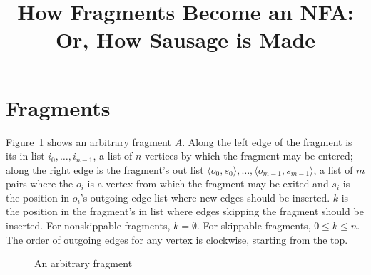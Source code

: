 \documentclass{article}
\begin{document}
\title{How Fragments Become an NFA:\\ Or, How Sausage is Made}
\maketitle

\section{Fragments}

Figure~\ref{fig:arbitrary} shows an arbitrary fragment $A$. Along the left edge of the fragment is its in list $i_0,\dots,i_{n-1}$, a list of $n$ vertices by which the fragment may be entered; along the right edge is the fragment's out list $\langle o_0,s_0\rangle,\dots,\langle o_{m-1},s_{m-1}\rangle$, a list of $m$ pairs where the $o_i$ is a vertex from which the fragment may be exited and $s_i$ is the position in $o_i$'s outgoing edge list where new edges should be inserted. $k$ is the position in the fragment's in list where edges skipping the fragment should be inserted. For nonskippable fragments, $k = \emptyset$. For skippable fragments, $0 \le k \le n$. The order of outgoing edges for any vertex is clockwise, starting from the top.

\begin{figure}[h]
\centering
{}
\caption{An arbitrary fragment\label{fig:arbitrary}}
\end{figure}
\end{document}
